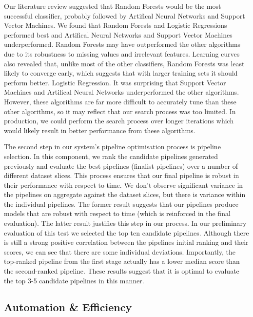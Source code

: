 \documentclass[../thesis/thesis.tex]{subfiles}
\begin{document}
Our literature review suggested that Random Forests would be the most successful classifier, probably followed by Artifical Neural Networks and Support Vector Machines. We found that Random Forests and Logistic Regressions performed best and Artifical Neural Networks and Support Vector Machines underperformed. Random Forests may have outperformed the other algorithms due to its robustness to missing values and irrelevant features. Learning curves also revealed that, unlike most of the other classifiers, Random Forests was least likely to converge early, which suggests that with larger training sets it should perform better. Logistic Regression. It was surprising that Support Vector Machines and Artifical Neural Networks underperformed the other algorithms. However, these algorithms are far more difficult to accurately tune than these other algorithms, so it may reflect that our search process was too limited. In production, we could perform the search process over longer iterations which would likely result in better performance from these algorithms.

The second step in our system's pipeline optimisation process is pipeline selection. In this component, we rank the candidate pipelines generated previously and evaluate the best pipelines (finalist pipelines) over a number of different dataset slices. This process ensures that our final pipeline is robust in their performance with respect to time. We don't observe significant variance in the pipelines on aggregate against the dataset slices, but there is variance within the individual pipelines. The former result suggests that our pipelines produce models that are robust with respect to time (which is reinforced in the final evaluation). The latter result justifies this step in our process. In our preliminary evaluation of this test we selected the top ten candidate pipelines. Although there is still a strong positive correlation between the pipelines initial ranking and their scores, we can see that there are some individual deviations. Importantly, the top-ranked pipeline from the first stage actually has a lower median score than the second-ranked pipeline. These results suggest that it is optimal to evaluate the top 3-5 candidate pipelines in this manner.

\subsection{Automation \& Efficiency} %
\end{document}
